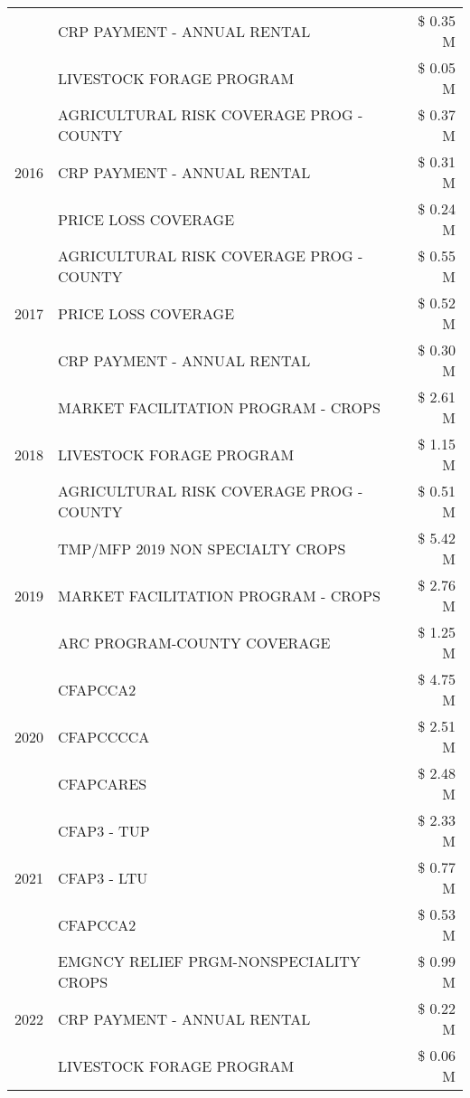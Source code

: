 \begin{tabular}{llr}
 & CRP PAYMENT - ANNUAL RENTAL & \$ 0.35 M \\
 & LIVESTOCK FORAGE PROGRAM & \$ 0.05 M \\
\cline{1-3}
\multirow[t]{3}{*}{2016} & AGRICULTURAL RISK COVERAGE PROG - COUNTY & \$ 0.37 M \\
 & CRP PAYMENT - ANNUAL RENTAL & \$ 0.31 M \\
 & PRICE LOSS COVERAGE & \$ 0.24 M \\
\cline{1-3}
\multirow[t]{3}{*}{2017} & AGRICULTURAL RISK COVERAGE PROG - COUNTY & \$ 0.55 M \\
 & PRICE LOSS COVERAGE & \$ 0.52 M \\
 & CRP PAYMENT - ANNUAL RENTAL & \$ 0.30 M \\
\cline{1-3}
\multirow[t]{3}{*}{2018} & MARKET FACILITATION PROGRAM - CROPS & \$ 2.61 M \\
 & LIVESTOCK FORAGE PROGRAM & \$ 1.15 M \\
 & AGRICULTURAL RISK COVERAGE PROG - COUNTY & \$ 0.51 M \\
\cline{1-3}
\multirow[t]{3}{*}{2019} & TMP/MFP 2019 NON SPECIALTY CROPS & \$ 5.42 M \\
 & MARKET FACILITATION PROGRAM - CROPS & \$ 2.76 M \\
 & ARC PROGRAM-COUNTY COVERAGE & \$ 1.25 M \\
\cline{1-3}
\multirow[t]{3}{*}{2020} & CFAPCCA2 & \$ 4.75 M \\
 & CFAPCCCCA & \$ 2.51 M \\
 & CFAPCARES & \$ 2.48 M \\
\cline{1-3}
\multirow[t]{3}{*}{2021} & CFAP3 - TUP & \$ 2.33 M \\
 & CFAP3 - LTU & \$ 0.77 M \\
 & CFAPCCA2 & \$ 0.53 M \\
\cline{1-3}
\multirow[t]{3}{*}{2022} & EMGNCY RELIEF PRGM-NONSPECIALITY CROPS & \$ 0.99 M \\
 & CRP PAYMENT - ANNUAL RENTAL & \$ 0.22 M \\
 & LIVESTOCK FORAGE PROGRAM & \$ 0.06 M \\
\cline{1-3}
\bottomrule
\end{tabular}
